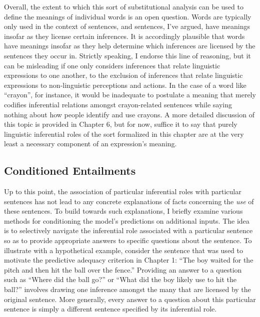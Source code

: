 Overall, the extent to which this sort of substitutional analysis can be used to define the meanings of individual words is an open question. Words are typically only used in the context of sentences, and sentences, I've argued, have meanings insofar as they license certain inferences. It is accordingly plausible that words have meanings insofar as they help determine which inferences are licensed by the sentences they occur in. Strictly speaking, I endorse this line of reasoning, but it can be misleading if one only considers inferences that relate linguistic expressions to one another, to the exclusion of inferences that relate linguistic expressions to non-linguistic perceptions and actions. In the case of a word like ``crayon'', for instance, it would be inadequate to postulate a meaning that merely codifies inferential relations amongst crayon-related sentences while saying nothing about how people identify and use crayons. A more detailed discussion of this topic is provided in Chapter 6, but for now, suffice it to say that purely linguistic inferential roles of the sort formalized in this chapter are at the very least a necessary component of an expression's meaning.

\subsection{Conditioned Entailments}

Up to this point, the association of particular inferential roles with particular sentences has not lead to any concrete explanations of facts concerning the \textit{use} of these sentences. To build towards such explanations, I briefly examine various methods for conditioning the model's predictions on additional inputs. The idea is to selectively navigate the inferential role associated with a particular sentence so as to provide appropriate answers to specific questions about the sentence. To illustrate with a hypothetical example, consider the sentence that was used to motivate the predictive adequacy criterion in Chapter 1: ``The boy waited for the pitch and then hit the ball over the fence.'' Providing an answer to a question such as ``Where did the ball go?'' or ``What did the boy likely use to hit the ball?'' involves drawing one inference amongst the many that are licensed by the original sentence. More generally, every answer to a question about this particular sentence is simply a different sentence specified by its inferential role.

